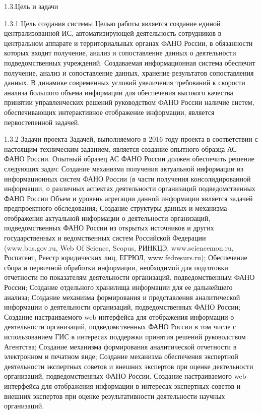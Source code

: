 1.3.Цель и задачи

1.3.1 Цель создания системы
Целью работы является создание единой централизованной ИС, автоматизирующей деятельность сотрудников в центральном аппарате и территориальных органах ФАНО России, в обязанности которых входит получение, анализ и сопоставление данных о деятельности подведомственных учреждений. Создаваемая информационная система обеспечит получение, анализ и сопоставление данных, хранение результатов сопоставления данных. 
В динамике современных условий увеличения требований к скорости анализа большого объема информации для обеспечения высокого качества принятии управленческих решений руководством ФАНО России наличие систем, обеспечивающих интерактивное отображение информации, является первостепенной задачей.

1.3.2 Задачи проекта
Задачей, выполняемого в 2016 году проекта в соответствии с настоящим техническим заданием, является создание опытного образца АС ФАНО России.
Опытный образец АС ФАНО России должен обеспечить решение следующих задач: 
Создание механизма получения актуальной информации из информационных систем ФАНО России (в части получения консолидированной информации, о различных аспектах деятельности организаций подведомственных ФАНО России Объем и уровень агрегации данной информации является задачей предпроектного обследования;
Создание структуры данных и механизма отображения  актуальной информации о деятельности организаций, подведомственных ФАНО России из открытых источников и других государственных и ведомственных систем Российской Федерации (www.bus.gov.ru, Web Of Science, Scopus, РИНКЦЭ, www.sciencemon.ru, Роспатент, Реестр юридических лиц, ЕГРЮЛ, www.fedresurs.ru);
Обеспечение сбора и первичной обработки информации, необходимой для подготовки отчетности по показателям деятельности организаций, подведомственным ФАНО России;
Создание отдельного хранилища информации для ее дальнейшего анализа;
Создание механизма формирования и представления аналитической информации о деятельности организаций, подведомственных ФАНО России;
Создание настраиваемого web интерфейса для отображения информации о деятельности организаций, подведомственных ФАНО России в том числе с использованием ГИС в интересах поддержки принятия решений руководством Агентства;
Создание механизма формирования аналитической отчетности в электронном и печатном виде;
Создание механизма обеспечения экспертной деятельности экспертных советов и внешних экспертов при оценке деятельности организаций, подведомственных ФАНО России. 
Создание настраиваемого web интерфейса для отображения информации в интересах экспертных советов и внешних экспертов при оценке результативности деятельности научных организаций.

